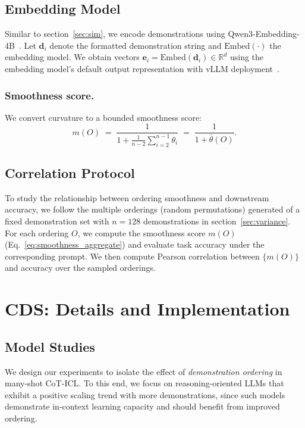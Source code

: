\documentclass{article}
\theoremstyle{plain}
\theoremstyle{definition}
\theoremstyle{remark}
\begin{document}
\subsection{Embedding Model}
\label{sec:embedding_details}
Similar to section~\ref{sec:sim}, we encode demonstrations using Qwen3-Embedding-4B~\cite{zhang2025qwen3embeddingadvancingtext}.
Let $\mathbf{d}_i$ denote the formatted demonstration string and $\mathrm{Embed}(\cdot)$ the embedding model.
We obtain vectors $\mathbf{e}_i = \mathrm{Embed}(\mathbf{d}_i) \in \mathbb{R}^d$ using the embedding model's default output representation with vLLM deployment~\cite{vllm}. 








\subsubsection{Smoothness score.}
We convert curvature to a bounded smoothness score:
\begin{equation}
m(O) \;=\; \frac{1}{1 + \frac{1}{n-2}\sum_{i=2}^{n-1}\theta_i}
\;=\;
\frac{1}{1+\bar{\theta}(O)}.
\end{equation}


\subsection{Correlation Protocol}
\label{sec:correlation_protocol}
To study the relationship between ordering smoothness and downstream accuracy, we follow the multiple orderings (random permutations) generated of a fixed demonstration set with $n=128$ demonstrations in section~\ref{sec:variance}.
For each ordering $O$, we compute the smoothness score $m(O)$ (Eq.~\eqref{eq:smoothness_aggregate}) and evaluate task accuracy under the corresponding prompt.
We then compute Pearson correlation between $\{m(O)\}$ and accuracy over the sampled orderings.


\section{CDS: Details and
Implementation}
\subsection{Model Studies}
\label{sec:exp_setting}
We design our experiments to isolate the effect of \emph{demonstration ordering} in many-shot CoT-ICL.
To this end, we focus on reasoning-oriented LLMs that exhibit a positive scaling trend with more demonstrations, since such models demonstrate in-context learning capacity and should benefit from improved ordering.
\end{document}
